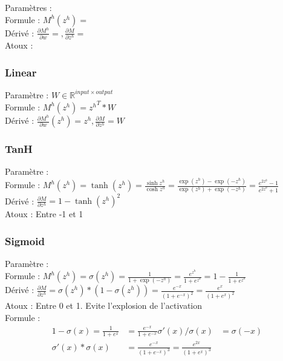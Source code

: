 \documentclass{article}
\begin{document}
\begin{multicols}{2}
Paramètres : \\
Formule : $ M^h(z^h) =  $ \\
Dérivé : $ \frac{\partial M^h}{\partial w} = , \frac{\partial M}{\partial z^h} = $ \\
Atoux : 


\subsubsection{Linear}
Paramètre : $ W \in \mathbb{R}^{input \times output} $ \\
Formule : $ M^h(z^h) =  {z^h}^T * W $ \\
Dérivé : $ \frac{\partial M^h}{\partial w}(z^h) = z^h, \frac{\partial M}{\partial z^h} = W $ \\

\subsubsection{TanH}
Paramètre : \\
Formule : $ M^h(z^h) =  \tanh(z^h) = \frac{\sinh z^h}{\cosh z^h} = \frac{\exp(z^h) - \exp(-z^h)} {\exp(z^h) + \exp(-z^h)} = \frac{e^{2z^h} - 1 }{e^{2z^h} + 1}$ \\
Dérivé : $\frac{\partial M}{\partial z^h} = 1 - \tanh (z^h)^2$ \\
Atoux : Entre -1 et 1


\subsubsection{Sigmoid}
Paramètre : \\
Formule : $ \displaystyle M^h(z^h) =  \sigma(z^h) = \frac{1}{1 + \exp(-z^h)} = \frac{e^{z^h}}{1 + e^{z^h}} = 1 - \frac{1}{1 + e^{z^h}}$ \\
Dérivé : $ \displaystyle \frac{\partial M}{\partial z^h} = \sigma (z^h) * (1 - \sigma (z^h)) = \frac{e^{-x}}{(1 + e^{-x})^2} = \frac{e^{x}}{(1+e^x)^2}$ \\
Atoux : Entre 0 et 1. Evite l'explosion de l'activation \\ 
Formule : \begin{align*}
    1 - \sigma (x) = \frac{1}{1 + e^x} &= \frac{e^{-x}}{1+e^{-x}}
    \sigma '(x) / \sigma (x) &= \sigma (-x) \\
    \sigma '(x) * \sigma (x) &= \frac{e^{-x}}{(1 + e^{-x})^3} = \frac{e^{2x}}{(1 + e^{x})^3}
\end{align*}



\end{multicols}
\end{document}
